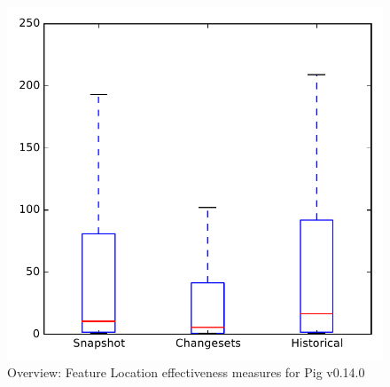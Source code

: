 
\begin{figure}
\centering
\includegraphics[height=0.4\textheight]{figures/flt/all_pig_no_outlier}
\caption{Overview: Feature Location effectiveness measures for Pig v0.14.0}
\label{fig:flt:all:pig}
\end{figure}
